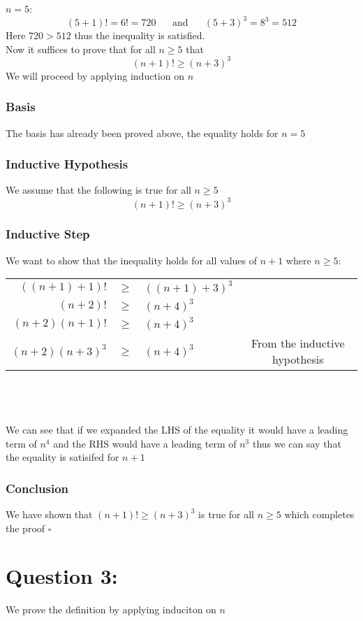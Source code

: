 \documentclass{article}
\begin{document}
$n=5$:
$$(5+1)!=6!=720\;\;\;\;\;\;\text{and}\;\;\;\;\;\;(5+3)^{3}=8^{3}=512$$
Here $720>512$ thus the inequality is satisfied.\\Now it suffices to prove that for all $n\geq 5$ that $$(n+1)!\geq (n+3)^{3}$$ We will proceed by applying induction on $n$
\subsubsection*{Basis}
The basis has already been proved above, the equality holds for $n=5$

\subsubsection*{Inductive Hypothesis} 
We assume that the following is true for all $n\geq 5$ $$(n+1)!\geq (n+3)^{3}$$

\subsubsection*{Inductive Step}
We want to show that the inequality holds for all values of $n+1$ where $n\geq 5$:
\begin{table}[htp]
\centering
\begin{tabular}{rclc}
  $((n+1)+1)!$ & $\geq$  & $((n+1)+3)^{3}$  &   \\
  $(n+2)!$ & $\geq$  & $(n+4)^{3}$  &   \\
  $(n+2)(n+1)!$ & $\geq$  & $(n+4)^{3}$  &   \\
  $(n+2)(n+3)^{3}$ & $\geq$  &  $(n+4)^{3}$ & From the inductive hypothesis  \\
\end{tabular}
\end{table}
 \\\\\\
We can see that if we expanded the LHS of the equality it would have a leading term of $n^{4}$ and the RHS would have a leading term of $n^{3}$ thus we can say that the equality is satisifed for $n+1$

\subsubsection*{Conclusion}
We have shown that $(n+1)! \geq (n+3)^{3}$ is true for all $n\geq 5$ which completes the proof $\square$
\newpage
\section*{Question 3:}
We prove the definition by applying induciton on $n$
\end{document}
